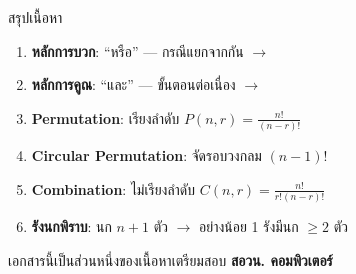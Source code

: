 \documentclass[11pt, aspectratio=169]{beamer}
\begin{document}
\begin{frame}{สรุปเนื้อหา}
  \begin{explanation}[สิ่งที่ได้เรียนรู้]
    \begin{enumerate}
      \item \textbf{หลักการบวก}: ``หรือ'' — กรณีแยกจากกัน $\rightarrow$ 
      \item \textbf{หลักการคูณ}: ``และ'' — ขั้นตอนต่อเนื่อง $\rightarrow$ 
      \item \textbf{Permutation}: เรียงลำดับ \quad $P(n,r) = \frac{n!}{(n-r)!}$
      \item \textbf{Circular Permutation}: จัดรอบวงกลม \quad $(n-1)!$
      \item \textbf{Combination}: ไม่เรียงลำดับ \quad $C(n,r) = \frac{n!}{r!(n-r)!}$
      \item \textbf{รังนกพิราบ}: นก $n+1$ ตัว $\rightarrow$ อย่างน้อย 1 รังมีนก $\geq 2$ ตัว
    \end{enumerate}
  \end{explanation}

  \begin{center}
    \large เอกสารนี้เป็นส่วนหนึ่งของเนื้อหาเตรียมสอบ \textbf{สอวน. คอมพิวเตอร์}
  \end{center}
\end{frame}
\end{document}
